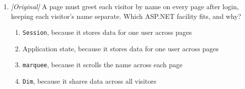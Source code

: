 \begin{enumerate}[label=\textbf{Q\arabic*.}, leftmargin=*]
\begin{enumerate}[label=\Roman*.]
    \item HTML is an ASCII-text document.
    \item JavaScript uses the \texttt{+} operator to concatenate strings.
    \item Dogpile keeps its own page index like Google.
  \end{enumerate}
  \begin{enumerate}[label=\Alph*.]
    \item I only
    \item I and II only
    \item II and III only
    \item I, II, and III
  \end{enumerate}
\item \textit{[Original]} A page must greet each visitor by name on every page
  after login, keeping each visitor's name separate. Which ASP.NET facility
  fits, and why?
  \begin{enumerate}[label=\Alph*.]
    \item \texttt{Session}, because it stores data for one user across pages
    \item Application state, because it stores data for one user across pages
    \item \texttt{marquee}, because it scrolls the name across each page
    \item \texttt{Dim}, because it shares data across all visitors
  \end{enumerate}


\end{enumerate}
